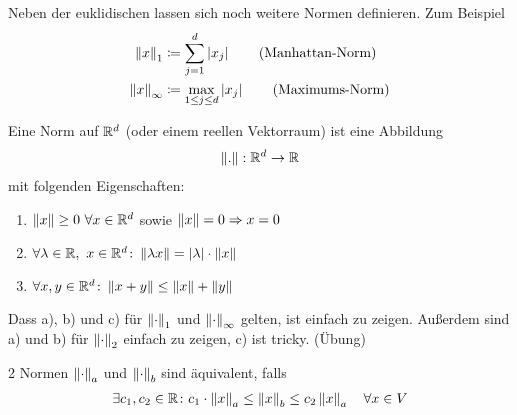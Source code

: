 \begin{beispiel}
    Neben der euklidischen lassen sich noch weitere Normen definieren. Zum Beispiel
    \begin{align*}
        \left\lVert x\right\rVert_1 &\coloneqq \sum_{j=1}^{d} \left\lvert x_j\right\rvert \tag{Manhattan-Norm}\\
        \left\lVert x\right\rVert_{\infty} &\coloneqq \max_{1\leq j \leq d} \left\lvert x_j\right\rvert\tag{Maximums-Norm}
    \end{align*}
\end{beispiel}

\begin{definition}[Norm] %
    Eine Norm auf $\mathbb{R}^d$ (oder einem reellen Vektorraum) ist eine Abbildung
    \begin{align*}
        \left\lVert.\right\rVert: \mathbb{R}^d\rightarrow{} \mathbb{R}
    \end{align*}
    mit folgenden Eigenschaften:
    \begin{enumerate}[label=\alph*)]
        \item $\left\lVert x\right\rVert \geq 0~\forall x\in\mathbb{R}^d$ sowie $\left\lVert x\right\rVert = 0\Rightarrow{} x=0$
        \item $\forall\lambda\in\mathbb{R},~x\in\mathbb{R}^d\colon \left\lVert\lambda x\right\rVert = \left\lvert\lambda\right\rvert\cdot\left\lVert x\right\rVert$
        \item $\forall x,y\in\mathbb{R}^d\colon\left\lVert x+y\right\rVert \leq \left\lVert x\right\rVert + \left\lVert y\right\rVert$\quad{}
    \end{enumerate}
\end{definition}

\begin{bemerkung}
    Dass a), b) und c) für $\left\lVert\cdot\right\rVert_1$ und $\left\lVert\cdot\right\rVert_{\infty}$ gelten, ist einfach zu zeigen. Außerdem sind a) und b) für $\left\lVert\cdot\right\rVert_2$ einfach zu zeigen, c) ist tricky. (Übung)
\end{bemerkung}

\begin{definition}
    2 Normen $\left\lVert\cdot\right\rVert_a$ und $\left\lVert\cdot\right\rVert_b$ sind äquivalent, falls
    \begin{align*}
        \exists c_1, c_2\in\mathbb{R}\colon c_1\cdot\left\lVert x\right\rVert_a \leq \left\lVert x\right\rVert_b \leq c_2 \left\lVert x\right\rVert_a\quad\forall x\in V
    \end{align*}
\end{definition}

